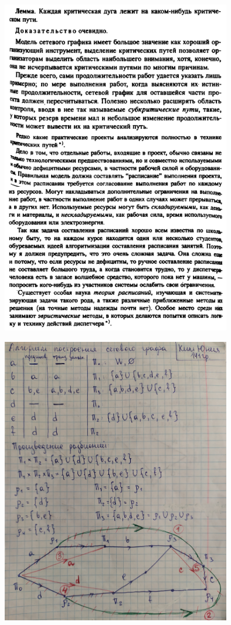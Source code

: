 \documentclass[discrete.tex]{subfiles}
\begin{document}
  \begin{figure}[H]
          \includegraphics[width=10cm]{pics/48_9}
          \centering
  \end{figure}

  \begin{figure}[H]
          \includegraphics[width=10cm]{pics/48_10}
          \centering
  \end{figure}
\end{document}
